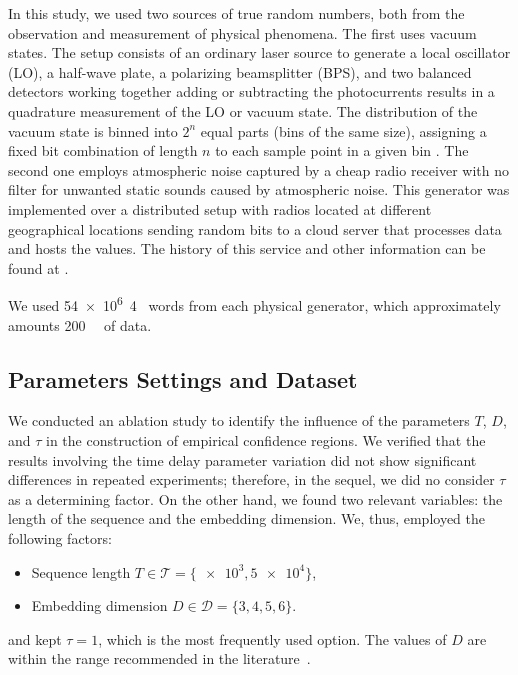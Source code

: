 In this study, we used two sources of true random numbers, both from the observation and measurement of physical phenomena.
The first uses vacuum states. 
The setup consists of an ordinary laser source to generate a local oscillator (LO), a half-wave plate, a polarizing beamsplitter (BPS), and two balanced detectors working together adding or subtracting the photocurrents results in a quadrature measurement of the LO or vacuum state. 
The distribution of the vacuum state is binned into $2^n$ equal parts (bins of the same size), assigning a fixed bit combination of length $n$ to each sample point in a given bin \citep{RNGVacuumStates}. 
The second one employs atmospheric noise captured by a cheap radio receiver with no filter for unwanted static sounds caused by atmospheric noise.
This generator was implemented over a distributed setup with radios located at different geographical locations sending random bits to a cloud server that processes data and hosts the values.
The history of this service and other information can be found at \citet{RandomOrg}.

We used \SI{54e6}{4\byte} words from each physical generator, which approximately amounts \SI{200}{\mega\byte} of data.


\subsection{Parameters Settings and Dataset}\label{Sec:Parameters}

We conducted an ablation study to identify the influence of the parameters $T$, $D$, and $\tau$ in the construction of empirical confidence regions.
We verified that the results involving the time delay parameter variation did not show significant differences in repeated experiments; therefore, in the sequel, we did no consider $\tau$ as a determining factor.
On the other hand, we found two relevant variables: 
the length of the sequence 
and the embedding dimension.
We, thus, employed the following factors:
\begin{itemize}
	\item Sequence length $T\in\mathcal T=\{ \num[scientific-notation=true]{e3}, \num[scientific-notation=true]{5 e4}\}$,
	\item Embedding dimension $D\in\mathcal D=\{3, 4, 5, 6\}$.
\end{itemize}
and kept $\tau=1$, which is the most frequently used option.
The values of $D$ are within the range recommended in the literature~\citep{PermutationEntropyBandtPompe}.

